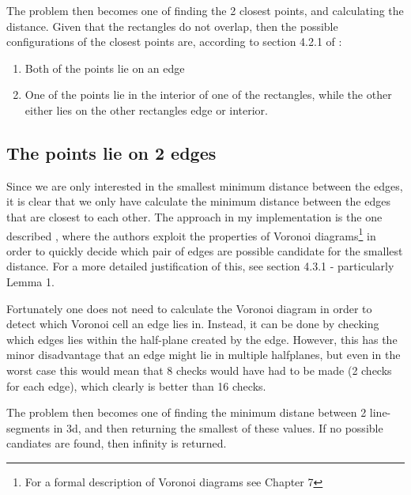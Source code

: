 The problem then becomes one of finding the 2 closest points, and calculating the distance.
Given that the rectangles do not overlap, then the possible configurations of the closest points are, according to section 4.2.1 of \cite{Larsen9fastproximity}:
\begin{enumerate}
\item Both of the points lie on an edge
\item One of the points lie in the interior of one of the rectangles, while the other either lies on the other rectangles edge or interior.
\end{enumerate}

\subsection{The points lie on 2 edges}
Since we are only interested in the smallest minimum distance between the edges, it is clear that we only have calculate the minimum distance between the edges that are closest to each other. The approach in my implementation is the one described \cite{Larsen99fastproximity}, where the authors exploit the properties of Voronoi diagrams\footnote{For a formal description of Voronoi diagrams see \cite{compgeom:2008} Chapter 7} in order to quickly decide which pair of edges are possible candidate for the smallest distance. For a more detailed justification of this, see \cite{Larsen99fastproximity} section 4.3.1 - particularly Lemma 1.  

Fortunately one does not need to calculate the Voronoi diagram in order to detect which Voronoi cell an edge lies in. Instead, it can be done by checking which edges lies within the half-plane created by the edge. However, this has the minor disadvantage that an edge might lie in multiple halfplanes, but even in the worst case this would mean that 8 checks would have had to be made (2 checks for each edge), which clearly is better than 16 checks.

The problem then becomes one of finding the minimum distane between 2 line-segments in 3d, and then returning the smallest of these values. If no possible candiates are found, then infinity is returned.


